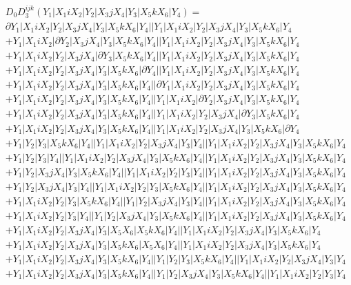 \documentclass{article}[12pt]
\begin{document}
\begin{align*}
& D_0 D_3^{ijk}(Y_1|X_1iX_2|Y_2|X_3jX_4|Y_3|X_5kX_6|Y_4) =\\
& \partial Y_1|X_1iX_2|Y_2|X_3jX_4|Y_3|X_5kX_6|Y_4||Y_1|X_1iX_2|Y_2|X_3jX_4|Y_3|X_5kX_6|Y_4\\ 
& + Y_1|X_1iX_2|\partial Y_2|X_3jX_4|Y_3|X_5kX_6|Y_4||Y_1|X_1iX_2|Y_2|X_3jX_4|Y_3|X_5kX_6|Y_4\\
& + Y_1|X_1iX_2|Y_2|X_3jX_4|\partial Y_3|X_5kX_6|Y_4||Y_1|X_1iX_2|Y_2|X_3jX_4|Y_3|X_5kX_6|Y_4\\
& + Y_1|X_1iX_2|Y_2|X_3jX_4|Y_3|X_5kX_6|\partial Y_4||Y_1|X_1iX_2|Y_2|X_3jX_4|Y_3|X_5kX_6|Y_4\\
& + Y_1|X_1iX_2|Y_2|X_3jX_4|Y_3|X_5kX_6|Y_4||\partial Y_1|X_1iX_2|Y_2|X_3jX_4|Y_3|X_5kX_6|Y_4\\
& + Y_1|X_1iX_2|Y_2|X_3jX_4|Y_3|X_5kX_6|Y_4||Y_1|X_1iX_2|\partial Y_2|X_3jX_4|Y_3|X_5kX_6|Y_4\\
& + Y_1|X_1iX_2|Y_2|X_3jX_4|Y_3|X_5kX_6|Y_4||Y_1|X_1iX_2|Y_2|X_3jX_4|\partial Y_3|X_5kX_6|Y_4\\
& + Y_1|X_1iX_2|Y_2|X_3jX_4|Y_3|X_5kX_6|Y_4||Y_1|X_1iX_2|Y_2|X_3jX_4|Y_3|X_5kX_6|\partial Y_4\\
 & +Y_1|Y_2|Y_3|X_5kX_6|Y_4||Y_1|X_1iX_2|Y_2|X_3jX_4|Y_3|Y_4||Y_1|X_1iX_2|Y_2|X_3jX_4|Y_3|X_5kX_6|Y_4\\ 
 & +Y_1|Y_2|Y_3|Y_4||Y_1|X_1iX_2|Y_2|X_3jX_4|Y_3|X_5kX_6|Y_4||Y_1|X_1iX_2|Y_2|X_3jX_4|Y_3|X_5kX_6|Y_4\\ 
 & +Y_1|Y_2|X_3jX_4|Y_3|X_5kX_6|Y_4||Y_1|X_1iX_2|Y_2|Y_3|Y_4||Y_1|X_1iX_2|Y_2|X_3jX_4|Y_3|X_5kX_6|Y_4\\ 
 & +Y_1|Y_2|X_3jX_4|Y_3|Y_4||Y_1|X_1iX_2|Y_2|Y_3|X_5kX_6|Y_4||Y_1|X_1iX_2|Y_2|X_3jX_4|Y_3|X_5kX_6|Y_4\\ 
 & +Y_1|X_1iX_2|Y_2|Y_3|X_5kX_6|Y_4||Y_1|Y_2|X_3jX_4|Y_3|Y_4||Y_1|X_1iX_2|Y_2|X_3jX_4|Y_3|X_5kX_6|Y_4\\ 
 & +Y_1|X_1iX_2|Y_2|Y_3|Y_4||Y_1|Y_2|X_3jX_4|Y_3|X_5kX_6|Y_4||Y_1|X_1iX_2|Y_2|X_3jX_4|Y_3|X_5kX_6|Y_4\\ 
 & +Y_1|X_1iX_2|Y_2|X_3jX_4|Y_3|X_5X_6|X_5kX_6|Y_4||Y_1|X_1iX_2|Y_2|X_3jX_4|Y_3|X_5kX_6|Y_4\\  
 & +Y_1|X_1iX_2|Y_2|X_3jX_4|Y_3|X_5kX_6|X_5X_6|Y_4||Y_1|X_1iX_2|Y_2|X_3jX_4|Y_3|X_5kX_6|Y_4\\  
 & +Y_1|X_1iX_2|Y_2|X_3jX_4|Y_3|X_5kX_6|Y_4||Y_1|Y_2|Y_3|X_5kX_6|Y_4||Y_1|X_1iX_2|Y_2|X_3jX_4|Y_3|Y_4\\ 
 & +Y_1|X_1iX_2|Y_2|X_3jX_4|Y_3|X_5kX_6|Y_4||Y_1|Y_2|X_3jX_4|Y_3|X_5kX_6|Y_4||Y_1|X_1iX_2|Y_2|Y_3|Y_4\\ 

\end{align*}
\end{document}
